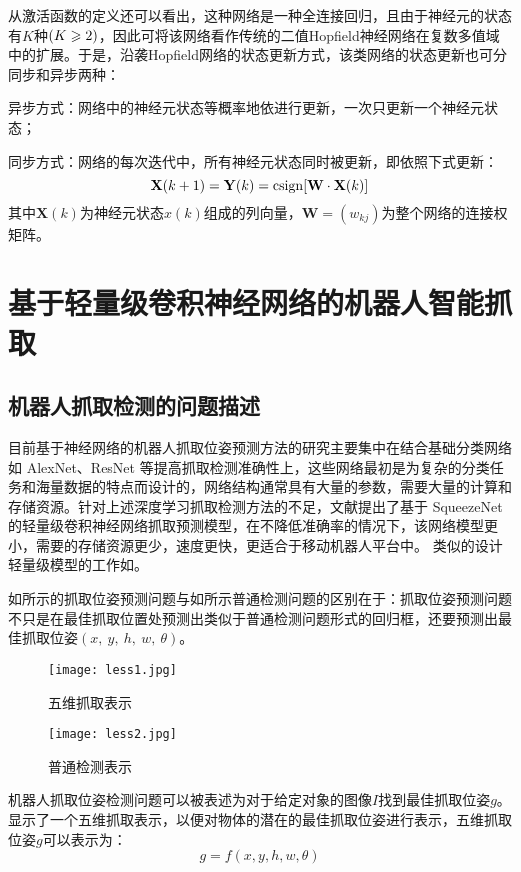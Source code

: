 \documentclass{yangthesis}
\begin{document}
从激活函数的定义还可以看出，这种网络是一种全连接回归，且由于神经元的状态有$K$种$(K\geqslant2)$，因此可将该网络看作传统的二值Hopf\/ield神经网络在复数多值域中的扩展。于是，沿袭Hopf\/ield网络的状态更新方式，该类网络的状态更新也可分同步和异步两种：

异步方式：网络中的神经元状态等概率地依进行更新，一次只更新一个神经元状态；

同步方式：网络的每次迭代中，所有神经元状态同时被更新，即依照下式更新：\begin{equation}
{\mathbf{ X}}(k+1)=\mathbf{ Y}(k)=\operatorname{csign}[\mathbf{ W }\cdot\mathbf{ X }(k)]               
\end{equation}
其中$\mathbf{ X}(k)$为神经元状态$x(k)$组成的列向量，$\mathbf{ W}=(w_{kj})$为整个网络的连接权矩阵。

\section{基于轻量级卷积神经网络的机器人智能抓取}

\subsection{机器人抓取检测的问题描述}

目前基于神经网络的机器人抓取位姿预测方法的研究主要集中在结合基础分类网络如 AlexNet、ResNet 等提高抓取检测准确性上，这些网络最初是为复杂的分类任务和海量数据的特点而设计的，网络结构通常具有大量的参数，需要大量的计算和存储资源。针对上述深度学习抓取检测方法的不足，文献\cite{bib:one}提出了基于 SqueezeNet 的轻量级卷积神经网络抓取预测模型，在不降低准确率的情况下，该网络模型更小，需要的存储资源更少，速度更快，更适合于移动机器人平台中。 类似的设计轻量级模型的工作如\cite{bib11}。

如所示的抓取位姿预测问题与如所示普通检测问题的区别在于：抓取位姿预测问题不只是在最佳抓取位置处预测出类似于普通检测问题形式的回归框，还要预测出最佳抓取位姿$(x,\ y,\ h,\ w,\ \theta)$。

\begin{figure}[!htbp]
	\centering
	\texttt{[image: less1.jpg]}
	\caption{五维抓取表示}
     \label{figless1}
\end{figure}
\begin{figure}[!htbp]
	\centering
	\texttt{[image: less2.jpg]}
	\caption{普通检测表示}
     \label{figless2}
\end{figure}

机器人抓取位姿检测问题可以被表述为对于给定对象的图像$I$找到最佳抓取位姿$g$。显示了一个五维抓取表示，以便对物体的潜在的最佳抓取位姿进行表示，五维抓取位姿$g$可以表示为：
\begin{equation}
g=f(x,y,h,w,\theta)
\label{eqgrasp}
\end{equation}
\end{document}
